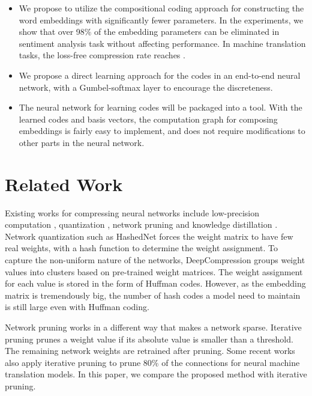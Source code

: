 \documentclass{article} \usepackage{iclr2018_conference_review,times}
\begin{document}
\begin{itemize}
    \item We propose to utilize the compositional coding approach for constructing the word embeddings with significantly fewer parameters. In the experiments, we show that over 98\% of the embedding parameters can be eliminated in sentiment analysis task without affecting performance. In machine translation tasks, the loss-free compression rate reaches .
    \item We propose a direct learning approach for the codes in an end-to-end neural network, with a Gumbel-softmax layer to encourage the discreteness.
    \item The neural network for learning codes will be packaged into a tool. With the learned codes and basis vectors, the computation graph for composing embeddings is fairly easy to implement, and does not require modifications to other parts in the neural network.
\end{itemize}


\section{Related Work}

Existing works for compressing neural networks include low-precision computation \citep{vanhoucke2011improving,hwang2014fixed,courbariaux2014low,Anwar2015FixedPO}, quantization \citep{Chen2015CompressingNN,han2015deep,Zhou2017IncrementalNQ}, network pruning \citep{LeCun1989OptimalBD,Hassibi1992SecondOD,Han2015LearningBW,Wen2016LearningSS} and knowledge distillation \citep{Hinton2015DistillingTK}. Network quantization such as HashedNet \citep{Chen2015CompressingNN} forces the weight matrix to have few real weights, with a hash function to determine the weight assignment. To capture the non-uniform nature of the networks, DeepCompression \citep{han2015deep} groups weight values into clusters based on pre-trained weight matrices. The weight assignment for each value is stored in the form of Huffman codes. However, as the embedding matrix is tremendously big, the number of hash codes a model need to maintain is still large even with Huffman coding.

Network pruning works in a different way that makes a network sparse. Iterative pruning \citep{Han2015LearningBW} prunes a weight value if its absolute value is smaller than a threshold. The remaining network weights are retrained after pruning. Some recent works \citep{See2016CompressionON,Zhang2017TowardsCA} also apply iterative pruning to prune 80\% of the connections for neural machine translation models. In this paper, we compare the proposed method with iterative pruning.
\end{document}
